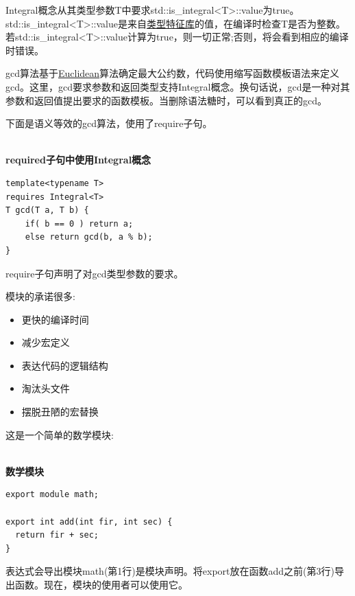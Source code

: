 Integral概念从其类型参数T中要求std::is\_integral<T>::value为true。std::is\_integral<T>::value是来自\href{https://en.cppreference.com/w/cpp/header/type_traits}{类型特征库}的值，在编译时检查T是否为整数。若std::is\_integral<T>::value计算为true，则一切正常;否则，将会看到相应的编译时错误。

gcd算法基于\href{https://en.wikipedia.org/wiki/Euclid}{Euclidean}算法确定最大公约数，代码使用缩写函数模板语法来定义gcd。这里，gcd要求参数和返回类型支持Integral概念。换句话说，gcd是一种对其参数和返回值提出要求的函数模板。当删除语法糖时，可以看到真正的gcd。

下面是语义等效的gcd算法，使用了require子句。

\hspace*{\fill} \\ %
\noindent
\textbf{required子句中使用Integral概念}
\begin{lstlisting}[style=styleCXX]
template<typename T>
requires Integral<T>
T gcd(T a, T b) {
	if( b == 0 ) return a;
	else return gcd(b, a % b);
}
\end{lstlisting}

require子句声明了对gcd类型参数的要求。


模块的承诺很多:

\begin{itemize}
\item 
更快的编译时间

\item 
减少宏定义

\item 
表达代码的逻辑结构

\item 
淘汰头文件

\item 
摆脱丑陋的宏替换
\end{itemize}

这是一个简单的数学模块:

\hspace*{\fill} \\ %
\noindent
\textbf{数学模块}
\begin{lstlisting}[style=styleCXX]
export module math;

export int add(int fir, int sec) {
  return fir + sec;
}
\end{lstlisting}

表达式会导出模块math(第1行)是模块声明。将export放在函数add之前(第3行)导出函数。现在，模块的使用者可以使用它。

